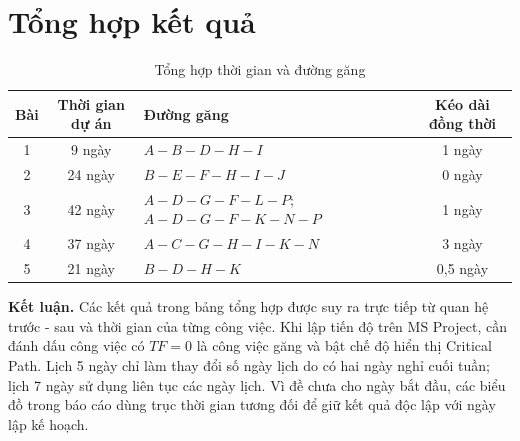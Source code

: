 \documentclass[12pt,a4paper]{article}
\begin{document}
\clearpage

\clearpage

\clearpage

\clearpage

\clearpage

\clearpage

\section{Tổng hợp kết quả}

\begin{table}[H]\centering
\caption{Tổng hợp thời gian và đường găng}
\small
\begin{tabular}{c|c|>{\centering\arraybackslash}p{7.2cm}|c}
\toprule
\textbf{Bài} & \textbf{Thời gian dự án} & \textbf{Đường găng} & \textbf{Kéo dài đồng thời}\\
\midrule
1 & 9 ngày & $A-B-D-H-I$ & 1 ngày\\
2 & 24 ngày & $B-E-F-H-I-J$ & 0 ngày\\
3 & 42 ngày & \parbox[c]{7.2cm}{\centering $A-D-G-F-L-P$;\\[-1pt] $A-D-G-F-K-N-P$} & 1 ngày\\
4 & 37 ngày & $A-C-G-H-I-K-N$ & 3 ngày\\
5 & 21 ngày & $B-D-H-K$ & 0,5 ngày\\
\bottomrule
\end{tabular}
\end{table}

\textbf{Kết luận.} Các kết quả trong bảng tổng hợp được suy ra trực tiếp từ
quan hệ trước - sau và thời gian của từng công việc. Khi lập tiến độ trên
MS Project, cần đánh dấu công việc có $TF=0$ là công việc găng và bật chế độ
hiển thị Critical Path. Lịch 5 ngày chỉ làm thay đổi số ngày lịch do có hai
ngày nghỉ cuối tuần; lịch 7 ngày sử dụng liên tục các ngày lịch. Vì đề chưa
cho ngày bắt đầu, các biểu đồ trong báo cáo dùng trục thời gian tương đối để
giữ kết quả độc lập với ngày lập kế hoạch.
\end{document}
